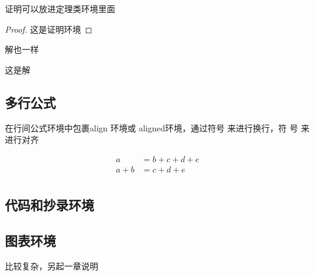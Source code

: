 \documentclass[supercite,fontset=windows]{../../upcthesis}
\begin{document}
\begin{theorem}

  证明可以放进定理类环境里面
\begin{proof}
这是证明环境
\end{proof}
\end{theorem}

\begin{example}
解也一样

\begin{solution}
这是解
\end{solution}

\end{example}


\subsection{多行公式}
在行间公式环境中包裹align 环境或 aligned环境，通过符号 来进行换行，符
号 来进行对齐

\begin{equation}
  \label{}
\begin{aligned}
  a&=b+c+d+e \\
  a+b&=c+d+e \\
\end{aligned}
\end{equation}


\subsection{代码和抄录环境}



\subsection{图表环境}
比较复杂，另起一章说明
\end{document}
